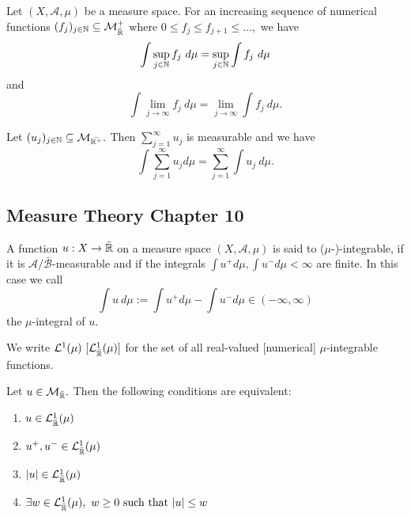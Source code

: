 \begin{thm}
Let \((X,\mathcal{A},\mu )\) be a measure space. For an increasing sequence of numerical functions \((f_{j})_{j\in \Bbb{N}}\subseteq \mathcal{M}_{\bar{\Bbb{R}}}^+\) where \(0\leq f_{j}\leq f_{j+1}\leq \ldots ,\) we have
\[
\int \sup_{j\in \Bbb{N}}f_{j}\  d\mu =\sup_{j\in \Bbb{N}}\int f_{j}\  d\mu 
\]
and
\[
\int \lim_{j\rightarrow \infty }f_{j}\  d\mu =\lim_{j\rightarrow \infty }\int f_{j}\  d\mu .
\]
\end{thm}

\begin{thm}
Let \((u_{j})_{j\in \Bbb{N}}\subseteq \mathcal{M}_{\bar{\Bbb R^+}}.\) Then \(\sum _{j=1}^\infty u_{j}\) is measurable and we have
\[
\int  \sum _{j=1}^\infty u_{j}d\mu  = \sum _{j=1}^\infty  \int u_{j}\  d\mu .
\]
\end{thm}

\subsection{Measure Theory Chapter 10}
\begin{defn}
A function \(u:X\rightarrow \bar{\Bbb{R}}\) on a measure space \((X,\mathcal{A},\mu )\) is said to (\(\mu \)-)-integrable, if it is \(\mathcal{A}/\bar{\mathcal{B}}\)-measurable and if the integrals \(\int u^+ d\mu ,\int u^- d\mu <\infty \) are finite. In this case we call
\[
\int u\  d\mu :=\int u^+ d\mu - \int u^- d\mu  \in (-\infty ,\infty )
\]
the \(\mu \)-integral of \(u.\)
\end{defn}

\begin{defn}
We write \(\mathcal{L}^1(\mu )\  [\mathcal{L}_{\bar{\Bbb{R}}}^1(\mu )]\) for the set of all real-valued [numerical] \(\mu \)-integrable functions.
\end{defn}

\begin{thm}
Let \(u\in \mathcal{M}_{\bar{\Bbb{R}}}.\) Then the following conditions are equivalent:

\begin{enumerate}
  \item \(u\in \mathcal{L}_{\bar{\Bbb{R}}}^1(\mu )\)
  \item \(u^+,u^-\in \mathcal{L}_{\bar{\Bbb{R}}}^1(\mu )\)
  \item \(|u| \in  \mathcal{L}_{\bar{\Bbb{R}}}^1(\mu )\)
  \item \(\exists w\in \mathcal{L}_{\bar{\Bbb{R}}}^1(\mu ),\  w\geq 0 \text{ such that } |u|\leq w\)
\end{enumerate}
	
\end{thm}

